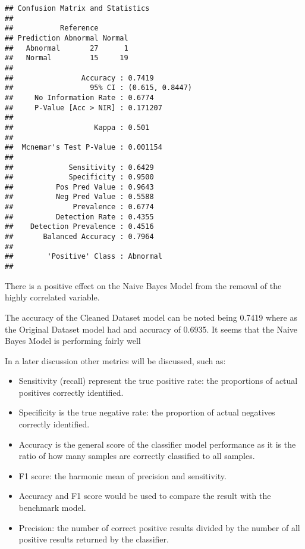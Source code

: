\documentclass[
]{article}
\providecommand{\tightlist}{%
  \setlength{\itemsep}{0pt}\setlength{\parskip}{0pt}}
\begin{document}
\begin{verbatim}
## Confusion Matrix and Statistics
## 
##           Reference
## Prediction Abnormal Normal
##   Abnormal       27      1
##   Normal         15     19
##                                          
##                Accuracy : 0.7419         
##                  95% CI : (0.615, 0.8447)
##     No Information Rate : 0.6774         
##     P-Value [Acc > NIR] : 0.171207       
##                                          
##                   Kappa : 0.501          
##                                          
##  Mcnemar's Test P-Value : 0.001154       
##                                          
##             Sensitivity : 0.6429         
##             Specificity : 0.9500         
##          Pos Pred Value : 0.9643         
##          Neg Pred Value : 0.5588         
##              Prevalence : 0.6774         
##          Detection Rate : 0.4355         
##    Detection Prevalence : 0.4516         
##       Balanced Accuracy : 0.7964         
##                                          
##        'Positive' Class : Abnormal       
## 
\end{verbatim}

There is a positive effect on the Naive Bayes Model from the removal of
the highly correlated variable.

The accuracy of the Cleaned Dataset model can be noted being 0.7419
where as the Original Dataset model had and accuracy of 0.6935. It seems
that the Naive Bayes Model is performing fairly well

In a later discussion other metrics will be discussed, such as:

\begin{itemize}
\tightlist
\item
  Sensitivity (recall) represent the true positive rate: the proportions
  of actual positives correctly identified.
\item
  Specificity is the true negative rate: the proportion of actual
  negatives correctly identified.
\item
  Accuracy is the general score of the classifier model performance as
  it is the ratio of how many samples are correctly classified to all
  samples.
\item
  F1 score: the harmonic mean of precision and sensitivity.
\item
  Accuracy and F1 score would be used to compare the result with the
  benchmark model.
\item
  Precision: the number of correct positive results divided by the
  number of all positive results returned by the classifier.
\end{itemize}
\end{document}
